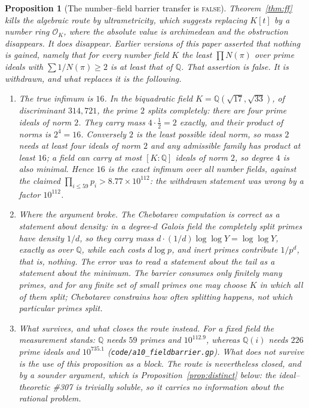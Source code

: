 \documentclass[11pt]{article}
\newtheorem{proposition}[theorem]{Proposition}
\theoremstyle{definition}
\begin{document}
\begin{proposition}[The number--field barrier transfer is \textsc{false}]\label{prop:fieldoptimal}
Theorem~\ref{thm:ff} kills the algebraic route by ultrametricity, which suggests replacing $K[t]$ by
a number ring $\mathcal{O}_K$, where the absolute value is archimedean and the obstruction
disappears. It does disappear. Earlier versions of this paper asserted that nothing is gained, namely
that for every number field $K$ the least $\prod N(\pi)$ over prime ideals with $\sum1/N(\pi)\ge2$ is
at least that of $\mathbb{Q}$. \emph{That assertion is false.} It is withdrawn, and what replaces it
is the following.
\begin{enumerate}[label=\textup{(\roman*)},leftmargin=2.2em]
\item \emph{The true infimum is $16$.} In the biquadratic field
$K=\mathbb{Q}(\sqrt{17},\sqrt{33})$, of discriminant $314{,}721$, the prime $2$ splits completely:
there are four prime ideals of norm $2$. They carry mass $4\cdot\tfrac12=2$ exactly, and their
product of norms is $2^4=16$. Conversely $2$ is the least possible ideal norm, so mass $2$ needs at
least four ideals of norm $2$ and any admissible family has product at least $16$; a field can carry
at most $[K:\mathbb{Q}]$ ideals of norm $2$, so degree $4$ is also minimal. Hence $16$ is the exact
infimum over all number fields, against the claimed $\prod_{i\le59}p_i>8.77\times10^{112}$: the
withdrawn statement was wrong by a factor $10^{112}$.
\item \emph{Where the argument broke.} The Chebotarev computation is correct as a statement about
\emph{density}: in a degree-$d$ Galois field the completely split primes have density $1/d$, so they
carry mass $d\cdot(1/d)\log\log Y=\log\log Y$, exactly as over $\mathbb{Q}$, while each costs
$d\log p$, and inert primes contribute $1/p^{d}$, that is, nothing. The error was to read a
statement about the tail as a statement about the minimum. The barrier consumes only \emph{finitely
many} primes, and for any finite set of small primes one may choose $K$ in which all of them split;
Chebotarev constrains how often splitting happens, not which particular primes split.
\item \emph{What survives, and what closes the route instead.} For a \emph{fixed} field the
measurement stands: $\mathbb{Q}$ needs $59$ primes and $10^{112.9}$, whereas $\mathbb{Q}(i)$ needs
$226$ prime ideals and $10^{735.1}$ \textup{(\texttt{code/a10\_fieldbarrier.gp})}. What does not
survive is the use of this proposition as a \emph{block}. The route is nevertheless closed, and by a
sounder argument, which is Proposition~\ref{prop:distinct} below: the ideal--theoretic \#307 is
\emph{trivially soluble}, so it carries no information about the rational problem.
\end{enumerate}
\end{proposition}
\end{document}
